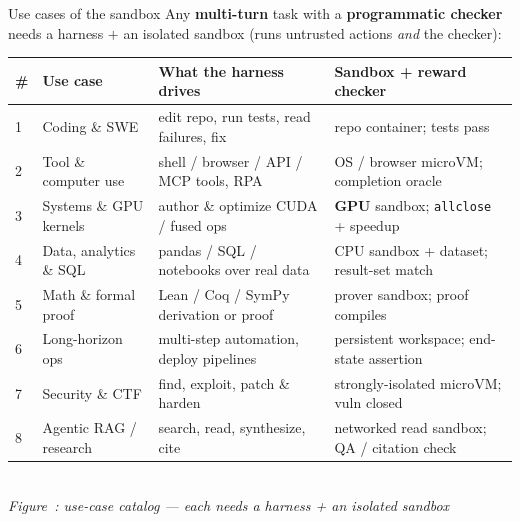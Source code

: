 \documentclass[aspectratio=169]{beamer}
\newcounter{deckfig}
\newcommand{\figtag}[1]{\refstepcounter{deckfig}%
  {\scriptsize\itshape Figure~\thedeckfig: #1}}
\begin{document}
\begin{frame}{Use cases of the sandbox}
  \footnotesize Any \textbf{multi-turn} task with a \textbf{programmatic checker} needs a harness $+$ an
  isolated sandbox (runs untrusted actions \emph{and} the checker):
  \begin{center}
  \renewcommand{\arraystretch}{0.95}\scriptsize
  \begin{tabular}{@{}p{0.3cm}p{2.5cm}p{4.3cm}p{4.7cm}@{}}
    \toprule
    \# & \textbf{Use case} & \textbf{What the harness drives} & \textbf{Sandbox + reward checker} \\
    \midrule
    1 & Coding \& SWE & edit repo, run tests, read failures, fix & repo container; tests pass~\cite{mbpp,swebench} \\
    2 & Tool \& computer use & shell / browser / API / MCP tools, RPA & OS / browser microVM; completion oracle \\
    3 & Systems \& GPU kernels & author \& optimize CUDA / fused ops & \textbf{GPU} sandbox; \texttt{allclose} + speedup~\cite{kernelbench} \\
    4 & Data, analytics \& SQL & pandas / SQL / notebooks over real data & CPU sandbox + dataset; result-set match \\
    5 & Math \& formal proof & Lean / Coq / SymPy derivation or proof & prover sandbox; proof compiles \\
    6 & Long-horizon ops & multi-step automation, deploy pipelines & persistent workspace; end-state assertion \\
    7 & Security \& CTF & find, exploit, patch \& harden & strongly-isolated microVM; vuln closed \\
    8 & Agentic RAG / research & search, read, synthesize, cite & networked read sandbox; QA / citation check \\
    \bottomrule
  \end{tabular}
  \\[0em]\figtag{use-case catalog --- each needs a harness + an isolated sandbox}
  \end{center}
\end{frame}
\end{document}
